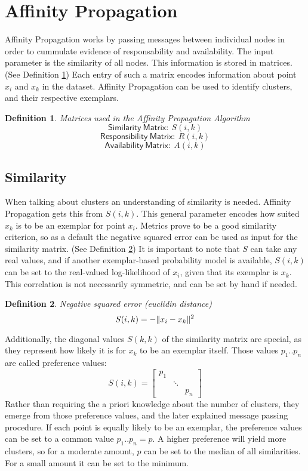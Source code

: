 \documentclass[11pt,a4paper]{article}
\newtheorem{definition}{Definition}
\DeclarePairedDelimiter\norm{\lVert}{\rVert}
\begin{document}
\pagebreak
\section{Affinity Propagation}

Affinity Propagation works by passing messages between individual nodes in order to cummulate evidence of responsability and availability. The input parameter is the similarity of all nodes. This information is stored in matrices. (See Definition \ref{def:matrices}) Each entry of such a matrix encodes information about point $x_i$ and $x_k$ in the dataset. Affinity Propagation can be used to identify clusters, and their respective exemplars.
\begin{definition}\label{def:matrices}
	Matrices used in the Affinity Propagation Algorithm
	\[
		\mathsf{Similarity\ Matrix:}\  S(i,k) 
	\]
	\[
		\mathsf{Responsibility\ Matrix:}\  R(i,k) 
	\]
	\[
		\mathsf{Availability\ Matrix:}\  A(i,k) 
	\]
\end{definition}
\subsection{Similarity}
When talking about clusters an understanding of similarity is needed. Affinity Propagation gets this from $S(i,k)$. This general parameter encodes how suited $x_k$ is to be an exemplar for point $x_i$. Metrics prove to be a good similarity criterion, so as a default the negative squared error can be used as input for the similarity matrix. \cite{frey2007clustering} (See Definition \ref{def:negsquared}) It is important to note that $S$ can take any real values, and if another exemplar-based probability model is available, $S(i,k)$ can be set to the real-valued log-likelihood of $x_i$, given that its exemplar is $x_k$. This correlation is not necessarily symmetric, and can be set by hand if needed. \cite{frey2007clustering}
\begin{definition}\label{def:negsquared}
	Negative squared error (euclidin distance)
	\[
		S(i,k) = - \norm{x_i - x_k}^2
	\]
\end{definition}
Additionally, the diagonal values $S(k,k)$ of the similarity matrix are special, as they represent how likely it is for $x_k$ to be an exemplar itself. Those values $p_1 .. p_n$ are called preference values:
\[
	S(i,k) = \begin{bmatrix}p_{1} & & \\ & \ddots & \\ & & p_{n}\end{bmatrix}
\]
Rather than requiring the a priori knowledge about the number of clusters, they emerge from those preference values, and the later explained message passing procedure. If each point is equally likely to be an exemplar, the preference values can be set to a common value $p_1..p_n = p$. A higher preference will yield more clusters, so for a moderate amount, $p$ can be set to the median of all similarities. For a small amount it can be set to the minimum.\cite{frey2007clustering}
\end{document}
